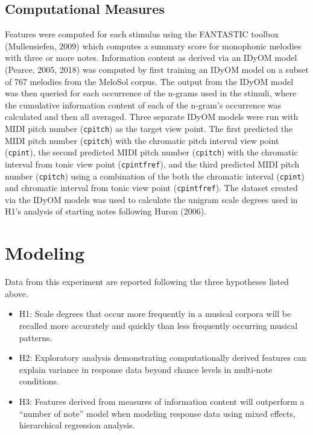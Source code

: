 \documentclass[english,man]{apa6}
\providecommand{\tightlist}{%
  \setlength{\itemsep}{0pt}\setlength{\parskip}{0pt}}
\begin{document}
\hypertarget{computational-measures}{%
\subsection{Computational Measures}\label{computational-measures}}

Features were computed for each stimulus using the FANTASTIC toolbox (Mullensiefen, 2009) which computes a summary score for monophonic melodies with three or more notes. Information content as derived via an IDyOM model (Pearce, 2005, 2018) was computed by first training an IDyOM model on a subset of 767 melodies from the MeloSol corpus.
The output from the IDyOM model was then queried for each occurrence of the n-grams used in the stimuli, where the cumulative information content of each of the n-gram's occurrence was calculated and then all averaged.
Three separate IDyOM models were run with MIDI pitch number (\texttt{cpitch}) as the target view point.
The first predicted the MIDI pitch number (\texttt{cpitch}) with the chromatic pitch interval view point (\texttt{cpint}), the second predicted MIDI pitch number (\texttt{cpitch}) with the chromatic interval from tonic view point (\texttt{cpintfref}), and the third predicted MIDI pitch number (\texttt{cpitch}) using a combination of the both the chromatic interval (\texttt{cpint}) and chromatic interval from tonic view point (\texttt{cpintfref}).
The dataset created via the IDyOM models was used to calculate the unigram scale degrees used in H1's analysis of starting notes following Huron (2006).

\hypertarget{modeling}{%
\section{Modeling}\label{modeling}}

Data from this experiment are reported following the three hypotheses listed above.

\begin{itemize}
\tightlist
\item
  H1: Scale degrees that occur more frequently in a musical corpora will be recalled more accurately and quickly than less frequently occurring musical patterns.
\item
  H2: Exploratory analysis demonstrating computationally derived features can explain variance in response data beyond chance levels in multi-note conditions.\\
\item
  H3: Features derived from measures of information content will outperform a \enquote{number of note} model when modeling response data using mixed effects, hierarchical regression analysis.
\end{itemize}
\end{document}
